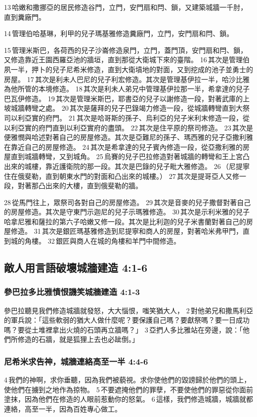 13 哈嫩和撒挪亞的居民修造谷門，立門，安門扇和閂、鎖，又建築城牆一千肘，直到糞廠門。

14 管理伯哈基琳，利甲的兒子瑪基雅修造糞廠門，立門，安門扇和閂、鎖。

15 管理米斯巴，各荷西的兒子沙崙修造泉門，立門，蓋門頂，安門扇和閂、鎖，又修造靠近王園西羅亞池的牆垣，直到那從大衛城下來的臺階。 16 其次是管理伯夙一半，押卜的兒子尼希米修造，直到大衛墳地的對面，又到挖成的池子並勇士的房屋。 17 其次是利未人巴尼的兒子利宏修造。其次是管理基伊拉一半，哈沙比雅為他所管的本境修造。 18 其次是利未人弟兄中管理基伊拉那一半，希拿達的兒子巴瓦伊修造。 19 其次是管理米斯巴，耶書亞的兒子以謝修造一段，對著武庫的上坡城牆轉彎之處。 20 其次是薩拜的兒子巴錄竭力修造一段，從城牆轉彎直到大祭司以利亞實的府門。 21 其次是哈哥斯的孫子、烏利亞的兒子米利末修造一段，從以利亞實的府門直到以利亞實府的盡頭。 22 其次是住平原的祭司修造。 23 其次是便雅憫與哈述對著自己的房屋修造。其次是亞難尼的孫子、瑪西雅的兒子亞撒利雅在靠近自己的房屋修造。 24 其次是希拿達的兒子賓內修造一段，從亞撒利雅的房屋直到城牆轉彎，又到城角。 25 烏賽的兒子巴拉修造對著城牆的轉彎和王上宮凸出來的城樓，靠近護衛院的那一段。其次是巴錄的兒子毗大雅修造。 26 （尼提寧住在俄斐勒，直到朝東水門的對面和凸出來的城樓。） 27 其次是提哥亞人又修一段，對著那凸出來的大樓，直到俄斐勒的牆。

28 從馬門往上，眾祭司各對自己的房屋修造。 29 其次是音麥的兒子撒督對著自己的房屋修造。其次是守東門示迦尼的兒子示瑪雅修造。 30 其次是示利米雅的兒子哈拿尼雅和薩拉的第六子哈嫩又修一段。其次是比利迦的兒子米書蘭對著自己的房屋修造。 31 其次是銀匠瑪基雅修造到尼提寧和商人的房屋，對著哈米弗甲門，直到城的角樓。 32 銀匠與商人在城的角樓和羊門中間修造。

\subsection{敵人用言語破壞城牆建造 4:1-6}
\subsubsection{參巴拉多比雅憤恨譏笑城牆建造 4:1-3}
參巴拉聽見我們修造城牆就發怒，大大惱恨，嗤笑猶大人， 2 對他弟兄和撒馬利亞的軍兵說：「這些軟弱的猶大人做什麼呢？要保護自己嗎？要獻祭嗎？要一日成功嗎？要從土堆裡拿出火燒的石頭再立牆嗎？」 3 亞捫人多比雅站在旁邊，說：「他們所修造的石牆，就是狐狸上去也必跐倒。」 

\subsubsection{尼希米求告神，城牆連絡高至一半 4:4-6}
4 我們的神啊，求你垂聽，因為我們被藐視。求你使他們的毀謗歸於他們的頭上，使他們在擄到之地作為掠物。 5 不要遮掩他們的罪孽，不要使他們的罪惡從你面前塗抹，因為他們在修造的人眼前惹動你的怒氣。 6 這樣，我們修造城牆，城牆就都連絡，高至一半，因為百姓專心做工。

